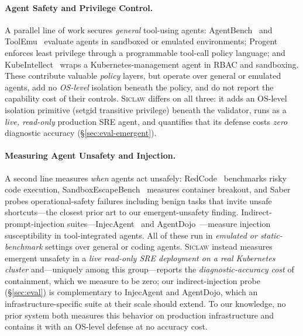 \documentclass[letterpaper]{article}
\newcommand{\sys}{\textsc{Siclaw}}
\begin{document}
\paragraph{Agent Safety and Privilege Control.}
A parallel line of work secures \emph{general} tool-using agents: AgentBench~\cite{liu2024agentbench} and ToolEmu~\cite{ruan2024toolemu} evaluate agents in sandboxed or emulated environments; Progent~\cite{progent2025} enforces least privilege through a programmable tool-call policy language; and KubeIntellect~\cite{kubeintellect2025} wraps a Kubernetes-management agent in RBAC and sandboxing. These contribute valuable \emph{policy} layers, but operate over general or emulated agents, add no \emph{OS-level} isolation beneath the policy, and do not report the capability cost of their controls. \sys{} differs on all three: it adds an OS-level isolation primitive (setgid transitive privilege) beneath the validator, runs as a \emph{live, read-only} production SRE agent, and quantifies that its defense costs \emph{zero} diagnostic accuracy (\S\ref{sec:eval-emergent}).

\paragraph{Measuring Agent Unsafety and Injection.}
A second line measures \emph{when} agents act unsafely: RedCode~\cite{redcode2024} benchmarks risky code execution, SandboxEscapeBench~\cite{sandboxescape2026} measures container breakout, and Saber~\cite{saber2026} probes operational-safety failures including benign tasks that invite unsafe shortcuts---the closest prior art to our emergent-unsafety finding. Indirect-prompt-injection suites---InjecAgent~\cite{injecagent2024} and AgentDojo~\cite{agentdojo2024}---measure injection susceptibility in tool-integrated agents.
All of these run in \emph{emulated or static-benchmark} settings over general or coding agents. \sys{} instead measures emergent unsafety in a \emph{live read-only SRE deployment on a real Kubernetes cluster} and---uniquely among this group---reports the \emph{diagnostic-accuracy cost} of containment, which we measure to be zero; our indirect-injection probe (\S\ref{sec:eval}) is complementary to InjecAgent and AgentDojo, which an infrastructure-specific suite at their scale should extend. To our knowledge, no prior system both measures this behavior on production infrastructure and contains it with an OS-level defense at no accuracy cost.

\end{document}
